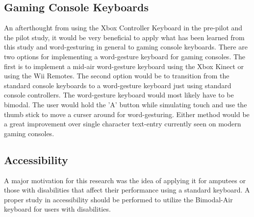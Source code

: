 \subsection{Gaming Console Keyboards}
An afterthought from using the Xbox Controller Keyboard in the pre-pilot and the pilot study, it would be very beneficial to apply what has been learned from this study and word-gesturing in general to gaming console keyboards. There are two options for implementing a word-gesture keyboard for gaming consoles. The first is to implement a mid-air word-gesture keyboard using the Xbox Kinect or using the Wii Remotes. The second option would be to transition from the standard console keyboards to a word-gesture keyboard just using standard console controllers. The word-gesture keyboard would most likely have to be bimodal. The user would hold the 'A' button while simulating touch and use the thumb stick to move a curser around for word-gesturing. Either method would be a great improvement over single character text-entry currently seen on modern gaming consoles.

\subsection{Accessibility}
A major motivation for this research was the idea of applying it for amputees or those with disabilities that affect their performance using a standard keyboard. A proper study in accessibility should be performed to utilize the Bimodal-Air keyboard for users with disabilities.

